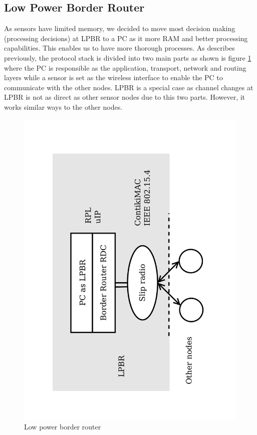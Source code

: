 \subsection{Low Power Border Router}
As sensors have limited memory, we decided to move most decision making (processing decisions) at LPBR to a PC as it more RAM and better processing capabilities. This enables us to have more thorough processes. As describes previously, the protocol stack is divided into two main parts as shown is figure \ref{fig_lpbr} where the PC is responsible as the application, transport, network and routing layers while a sensor is set as the wireless interface to enable the PC to communicate with the other nodes. LPBR is a special case as channel changes at LPBR is not as direct as other sensor nodes due to this two parts. However, it works similar ways to the other nodes.

\begin{figure}
\centering
\includegraphics[trim=2cm 2cm 3cm 2cm, clip=true, totalheight=0.45\textheight, angle=270]{BR2.pdf}
\caption{Low power border router}
\label{fig_lpbr}
\end{figure}

